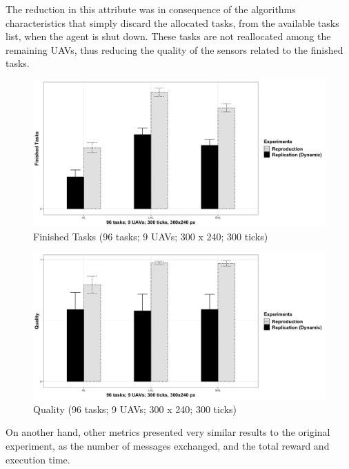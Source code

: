The reduction in this attribute was in consequence of the algorithms characteristics that simply discard the allocated tasks, from the available tasks list, when the agent is shut down. These tasks are not reallocated among the remaining UAVs, thus reducing the quality of the sensors related to the finished tasks.

\begin{figure}[h!]
	\begin{center}
		\includegraphics[scale=0.15]{fig/GRAPH01.png}
		\caption{Finished Tasks (96 tasks; 9 UAVs; 300 x 240; 300 ticks)}
		\label{fig:fig04}
	\end{center}
\end{figure}

\begin{figure}[h!]
	\begin{center}
		\includegraphics[scale=0.15]{fig/GRAPH02.png}
		\caption{Quality (96 tasks; 9 UAVs; 300 x 240; 300 ticks)}
		\label{fig:fig03}
	\end{center}
\end{figure}

On another hand, other metrics presented very similar results to the original experiment, as the number of messages exchanged, and the total reward and execution time.

